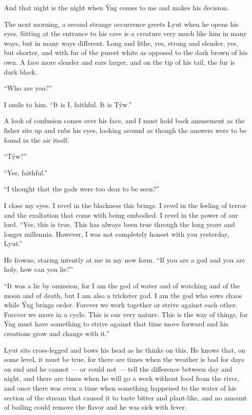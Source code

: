 And that night is the night when Ýng comes to me and makes his decision.

The next morning, a second strange occurrence greets Lyut when he opens his eyes. Sitting at the entrance to his cave is a creature very much like him in many ways, but in many ways different. Long and lithe, yes, strong and slender, yes, but shorter, and with fur of the purest white as opposed to the dark brown of his own. A face more slender and ears larger, and on the tip of his tail, the fur is dark black.

``Who are you?''

I smile to him. ``It is I, faithful. It is Týw.''

A look of confusion comes over his face, and I must hold back amusement as the fisher sits up and rubs his eyes, looking around as though the answers were to be found in the air itself.

``Týw?''

``Yes, faithful.''

``I thought that the gods were too dear to be seen?''

I close my eyes. I revel in the blackness this brings. I revel in the feeling of terror and the exaltation that come with being embodied. I revel in the power of our lord. ``Yes, this is true. This has always been true through the long years and longer millennia. However, I was not completely honest with you yesterday, Lyut.''

He frowns, staring intently at me in my new form. ``If you are a god and you are holy, how can you lie?''

``It was a lie by omission, for I am the god of water and of watching and of the moon and of death, but I am also a trickster god. I am the god who sows chaos while Ýng brings order. Forever we work together or strive against each other. Forever we move in a cycle. This is our very nature. This is the way of things, for Ýng must have something to strive against that time move forward and his creations grow and change with it.''

Lyut sits cross-legged and bows his head as he thinks on this. He knows that, on some level, it must be true, for there are times when the weather is bad for days on end and he cannot --- or could not --- tell the difference between day and night, and there are times when he will go a week without food from the river, and once there was even a time when something happened to the water of his section of the stream that caused it to taste bitter and plant-like, and no amount of boiling could remove the flavor and he was sick with fever.

